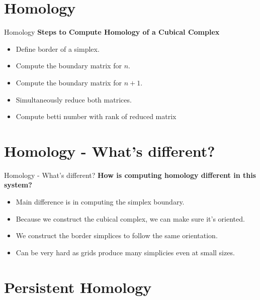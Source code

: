 \documentclass[aspectratio=169,xcolor=dvipsnames]{beamer}
\begin{document}
\section{Homology}

\begin{frame}{Homology}
    \textbf{Steps to Compute Homology of a Cubical Complex}
    \begin{itemize}
        \item Define border of a simplex.
        \item Compute the boundary matrix for $n$.
        \item Compute the boundary matrix for $n + 1$.
        \item Simultaneously reduce both matrices.
        \item Compute betti number with rank of reduced matrix
    \end{itemize}
\end{frame}

\section{Homology - What's different?}

\begin{frame}{Homology - What's different?}
    \textbf{How is computing homology different in this system?}
    \begin{itemize}
        \item Main difference is in computing the simplex boundary.
        \item Because we construct the cubical complex, we can make sure it's oriented.
        \item We construct the border simplices to follow the same orientation.
        \item Can be very hard as grids produce many simplicies even at small sizes.
    \end{itemize}
\end{frame}

\section{Persistent Homology}
\end{document}
